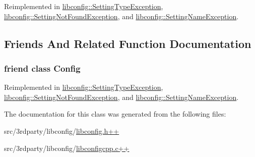 Reimplemented in \hyperlink{classlibconfig_1_1_setting_type_exception_a50c015f8011c3ffa3dce6a4a25072ec7}{libconfig::SettingTypeException}, \hyperlink{classlibconfig_1_1_setting_not_found_exception_a10ddbf9dfba0e1d43e84ad9f746f4dc3}{libconfig::SettingNotFoundException}, and \hyperlink{classlibconfig_1_1_setting_name_exception_a6a65369f3eb5c02ee92fc71a31c99ebc}{libconfig::SettingNameException}.



\subsection{Friends And Related Function Documentation}
\hypertarget{classlibconfig_1_1_setting_exception_ac3da7e21a05bf8852638db7e4dd1b81a}{
\subsubsection[{Config}]{\setlength{\rightskip}{0pt plus 5cm}friend class {\bf Config}}}
\label{classlibconfig_1_1_setting_exception_ac3da7e21a05bf8852638db7e4dd1b81a}


Reimplemented in \hyperlink{classlibconfig_1_1_setting_type_exception_ac3da7e21a05bf8852638db7e4dd1b81a}{libconfig::SettingTypeException}, \hyperlink{classlibconfig_1_1_setting_not_found_exception_ac3da7e21a05bf8852638db7e4dd1b81a}{libconfig::SettingNotFoundException}, and \hyperlink{classlibconfig_1_1_setting_name_exception_ac3da7e21a05bf8852638db7e4dd1b81a}{libconfig::SettingNameException}.



The documentation for this class was generated from the following files:\begin{DoxyCompactItemize}
\item 
src/3rdparty/libconfig/\hyperlink{libconfig_8h_09_09}{libconfig.h++}\item 
src/3rdparty/libconfig/\hyperlink{libconfigcpp_8c_09_09}{libconfigcpp.c++}\end{DoxyCompactItemize}
